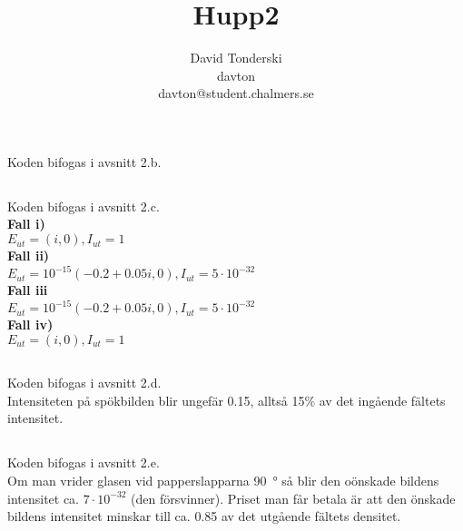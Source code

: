 \documentclass{article}
\begin{document}
	\title{Hupp2}
	\author{David Tonderski\\davton\\davton@student.chalmers.se}
	\date{}
	\maketitle
	
\setcounter{subsection}{1}
\setcounter{section}{1}
\subsection{}
Koden bifogas i avsnitt 2.b.
\subsection{}

Koden bifogas i avsnitt 2.c.\\\newline
\indent{}\textbf{Fall i)}\\
\indent{}$E_{ut}=(i,0), I_{ut}=1$\\\newline
\indent{}\textbf{Fall ii)}\\
\indent{}$E_{ut}=10^{-15}(-0.2+0.05i,0), I_{ut}=5\cdot10^{-32}$\\\newline
\indent{}\textbf{Fall iii}\\
\indent{}$E_{ut}=10^{-15}(-0.2+0.05i,0), I_{ut}=5\cdot10^{-32}$\\\newline
\indent{}\textbf{Fall iv)}\\
\indent{}$E_{ut}=(i,0), I_{ut}=1$
\subsection{}
Koden bifogas i avsnitt 2.d.\\\newline
Intensiteten på spökbilden blir ungefär 0.15, alltså 15\% av det ingående fältets intensitet.
\subsection{}
Koden bifogas i avsnitt 2.e.\\\newline
Om man vrider glasen vid papperslapparna \SI{90}{\degree} så blir den oönskade bildens intensitet ca. $7 \cdot 10^{-32}$ (den försvinner). Priset man får betala är att den önskade bildens intensitet minskar till ca. 0.85 av det utgående fältets densitet.
\end{document}
